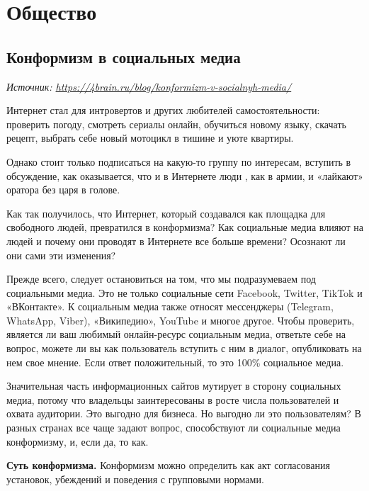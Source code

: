 \chapter{Общество}

\section{Конформизм в социальных медиа}

\textit{Источник: \url{https://4brain.ru/blog/konformizm-v-socialnyh-media/}}

Интернет стал  для интровертов и других любителей самостоятельности: проверить погоду, смотреть сериалы онлайн, обучиться новому языку, скачать рецепт, выбрать себе новый мотоцикл в тишине и уюте квартиры.

Однако стоит только подписаться на какую-то группу по интересам, вступить в обсуждение, как оказывается, что и в Интернете люди , как в армии, и «лайкают» оратора без царя в голове.

Как так получилось, что Интернет, который создавался как площадка для свободного  людей, превратился в  конформизма? Как социальные медиа влияют на людей и почему они проводят в Интернете все больше времени? Осознают ли они сами эти изменения?

Прежде всего, следует остановиться на том, что мы подразумеваем под социальными медиа. Это не только социальные сети Facebook, Twitter, TikTok и «ВКонтакте». К социальным медиа также относят мессенджеры (Telegram, WhatsApp, Viber), «Википедию», YouTube и многое другое. Чтобы проверить, является ли ваш любимый онлайн-ресурс социальным медиа, ответьте себе на вопрос, можете ли вы как пользователь вступить с ним в диалог, опубликовать на нем свое мнение. Если ответ положительный, то это 100\% социальное медиа.

Значительная часть информационных сайтов мутирует в сторону социальных медиа, потому что владельцы заинтересованы в росте числа пользователей и охвата аудитории. Это выгодно для бизнеса. Но выгодно ли это пользователям? В разных странах все чаще задают вопрос, способствуют ли социальные медиа конформизму, и, если да, то как.

\textbf{Суть конформизма.}
Конформизм можно определить как акт согласования установок, убеждений и поведения с групповыми нормами.

